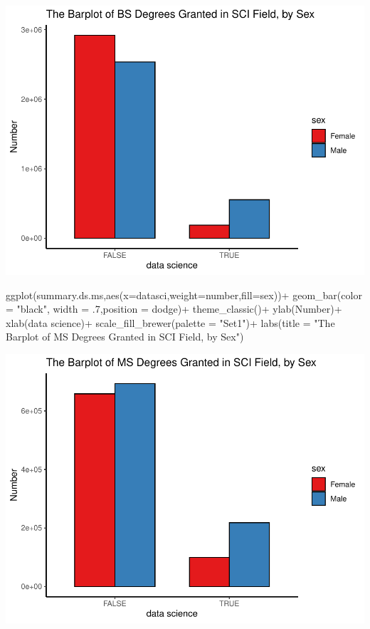 \documentclass[
  12pt,
]{article}
\newenvironment{Shaded}{\begin{snugshade}}{\end{snugshade}}
\newcommand{\AttributeTok}[1]{\textcolor[rgb]{0.77,0.63,0.00}{#1}}
\newcommand{\DecValTok}[1]{\textcolor[rgb]{0.00,0.00,0.81}{#1}}
\newcommand{\FunctionTok}[1]{\textcolor[rgb]{0.00,0.00,0.00}{#1}}
\newcommand{\NormalTok}[1]{#1}
\newcommand{\SpecialCharTok}[1]{\textcolor[rgb]{0.00,0.00,0.00}{#1}}
\newcommand{\StringTok}[1]{\textcolor[rgb]{0.31,0.60,0.02}{#1}}
\begin{document}
\includegraphics{hw1_sol_files/figure-latex/unnamed-chunk-12-1.pdf}

\begin{Shaded}
\begin{Highlighting}[]
\FunctionTok{ggplot}\NormalTok{(summary.ds.ms,}\FunctionTok{aes}\NormalTok{(}\AttributeTok{x=}\NormalTok{datasci,}\AttributeTok{weight=}\NormalTok{number,}\AttributeTok{fill=}\NormalTok{sex))}\SpecialCharTok{+}
  \FunctionTok{geom\_bar}\NormalTok{(}\AttributeTok{color =} \StringTok{"black"}\NormalTok{, }\AttributeTok{width =}\NormalTok{ .}\DecValTok{7}\NormalTok{,}\AttributeTok{position =} \StringTok{\textquotesingle{}dodge\textquotesingle{}}\NormalTok{)}\SpecialCharTok{+}
  \FunctionTok{theme\_classic}\NormalTok{()}\SpecialCharTok{+}
  \FunctionTok{ylab}\NormalTok{(}\StringTok{\textquotesingle{}Number\textquotesingle{}}\NormalTok{)}\SpecialCharTok{+}
  \FunctionTok{xlab}\NormalTok{(}\StringTok{\textquotesingle{}data science\textquotesingle{}}\NormalTok{)}\SpecialCharTok{+}
  \FunctionTok{scale\_fill\_brewer}\NormalTok{(}\AttributeTok{palette =} \StringTok{"Set1"}\NormalTok{)}\SpecialCharTok{+}
  \FunctionTok{labs}\NormalTok{(}\AttributeTok{title =} \StringTok{"The Barplot of MS Degrees Granted in SCI Field, by Sex"}\NormalTok{)}
\end{Highlighting}
\end{Shaded}

\includegraphics{hw1_sol_files/figure-latex/unnamed-chunk-12-2.pdf}
\end{document}
